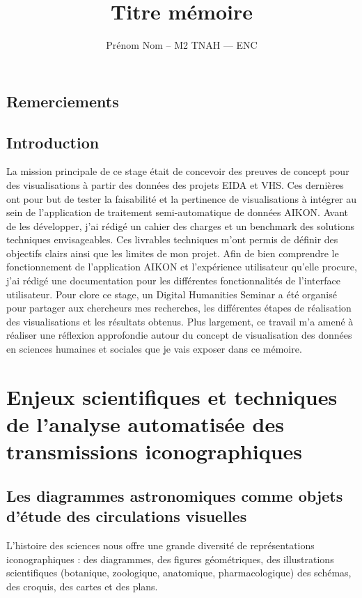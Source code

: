 \documentclass[a4paper,12pt,twoside]{book}
\author{Prénom Nom – M2 TNAH — ENC}
\title{Titre mémoire}
\newcommand\chapterNo[1]{
	\chapter*{#1}
	\markright{\MakeUppercase{#1}}
}
\begin{document}
	
	\onehalfspacing 
	
	\frontmatter
	
	
	
	\thispagestyle{empty}	
	\cleardoublepage
	
	
	
	\chapterNo{Remerciements}
	
	\chapterNo{Introduction}
	
	La mission principale de ce stage était de concevoir des preuves de concept pour des visualisations à partir des données des projets EIDA et VHS. Ces dernières ont pour but de tester la faisabilité et la pertinence de visualisations à intégrer au sein de l’application de traitement semi-automatique de données AIKON. Avant de les développer, j’ai rédigé un cahier des charges et un benchmark des solutions techniques envisageables. Ces livrables techniques m’ont permis de définir des objectifs clairs ainsi que les limites de mon projet. Afin de bien comprendre le fonctionnement de l’application AIKON et l’expérience utilisateur qu’elle procure, j’ai rédigé une documentation pour les différentes fonctionnalités de l’interface utilisateur. Pour clore ce stage, un Digital Humanities Seminar a été organisé pour partager aux chercheurs mes recherches, les différentes étapes de réalisation des visualisations et les résultats obtenus. Plus largement, ce travail m’a amené à réaliser une réflexion approfondie autour du concept de visualisation des données en sciences humaines et sociales que je vais exposer dans ce mémoire. 
	
	
	\thispagestyle{empty}
	\cleardoublepage
	
	\mainmatter
	
	\part{Enjeux scientifiques et techniques de l'analyse automatisée des transmissions iconographiques}

	
	\chapter[Les diagrammes astronomiques]{Les diagrammes astronomiques comme objets d'étude des circulations visuelles}
	
	L'histoire des sciences nous offre une grande diversité de représentations iconographiques : des diagrammes, des figures géométriques, des illustrations scientifiques (botanique, zoologique, anatomique, pharmacologique) des schémas, des croquis, des cartes et des plans.
	
\end{document}
